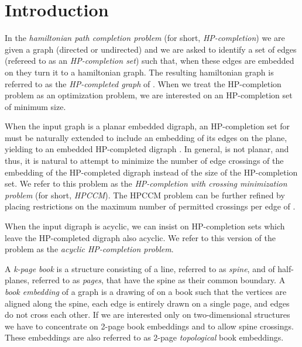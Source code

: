\documentclass{myllncs-mixalis}
\newcommand{\eat}[1] {{}}
\begin{document}
\eat{
\textbf{TO FIX IN PAPER}
\begin{enumerate}
\item

\end{enumerate}
}





\section{Introduction}
In the \emph{hamiltonian path completion problem} (for short,
\emph{HP-completion}) we are given a graph  (directed or
undirected) and we are asked to identify a set of edges (refereed to
as an \emph{HP-completion set}) such that, when these edges are
embedded on   they turn it to a hamiltonian graph. The resulting
hamiltonian graph  is referred to as the
\emph{HP-completed graph} of .
 When we treat the HP-completion problem as an
optimization problem, we are interested on an HP-completion set of
minimum size.

When the input graph  is a planar embedded digraph, an
HP-completion set for  must be naturally extended to include an
embedding of its edges on the plane, yielding to an embedded
HP-completed digraph . In general,  is not
planar, and thus, it is natural to attempt to minimize the number of
edge crossings of the embedding of the HP-completed digraph
 instead of the size of the HP-completion set. We refer to
this problem as the \emph{HP-completion with crossing minimization
problem} (for short, \emph{HPCCM}). The HPCCM problem can be further
refined  by placing restrictions on the maximum number of permitted
crossings per edge of  .

When the input digraph  is acyclic, we can insist on
HP-completion sets which leave the HP-completed digraph 
also acyclic. We refer to this version of the problem as the
\emph{acyclic HP-completion problem}.

A \emph{k-page book} is a structure consisting of a line, referred
to as \emph{spine}, and of  half-planes, referred to as
\emph{pages}, that have the spine as their common boundary. A
\emph{book embedding} of a  graph  is a drawing of  on a book
such that the vertices are aligned along the spine, each edge is
entirely drawn on a single page, and edges do not cross each other.
If we are interested only on two-dimensional structures we have to
concentrate on  2-page book embeddings and to allow spine crossings.
These embeddings are  also referred to as  2-page\emph{ topological
}book embeddings.
\end{document}
